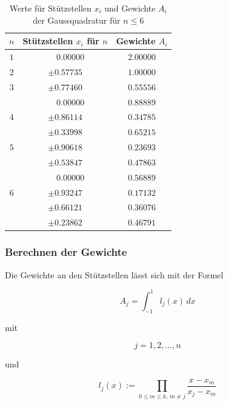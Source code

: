 \begin{table}[h!]
    \centering
    \begin{tabular}{|c|c|c|}
        \hline
        $n$ & Stützstellen $x_{i}$ für $n$ & Gewichte $A_{i}$\\
        \hline
        $1$ & $ \phantom{-} 0.00000 $ & $ 2.00000 $ \\
        \hline
        $2$ & $ \pm 0.57735 $ & $ 1.00000 $ \\
        \hline
        $3$ & $ \pm 0.77460 $ & $ 0.55556 $ \\
            & $ \phantom{-} 0.00000 $ & $ 0.88889 $ \\
        \hline
        $4$ & $ \pm 0.86114 $ & $ 0.34785 $ \\
            & $ \pm 0.33998 $ & $ 0.65215 $ \\
        \hline
        $5$ & $ \pm 0.90618 $ & $ 0.23693 $ \\
            & $ \pm 0.53847 $ & $ 0.47863 $ \\
            & $ \phantom{-} 0.00000 $ & $ 0.56889 $ \\
        \hline
        $6$ & $ \pm 0.93247 $ & $ 0.17132 $ \\
            & $ \pm 0.66121 $ & $ 0.36076 $ \\
            & $ \pm 0.23862 $ & $ 0.46791 $ \\
        \hline
    \end{tabular}
    \caption{Werte für Stützstellen $x_{i}$ und Gewichte $A_{i}$ der Gaussquadratur für $n \leq 6$
    \label{buch:table:gaussgewichtwerte}}    
\end{table}

\subsubsection{Berechnen der Gewichte}
Die Gewichte an den Stützstellen lässt sich mit der Formel

\begin{equation*}
    A_{j} = \int_{-1}^{1} l_j(x) \, dx
\end{equation*}

\noindent
mit

\begin{equation*}
    j = 1, 2, ... , n
\end{equation*}

\noindent
und 

\begin{equation}
    l_{j}(x) := \prod_{0 \leq m \leq k, \, m \neq j} \frac{x - x_{m}}{x_{j} - x_{m}}
\end{equation}

